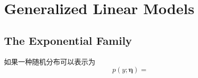 \chapter{Generalized Linear Models}
	\section{The Exponential Family}
		如果一种随机分布可以表示为
		\begin{equation}
			p(y; \bm{\eta}) = 
		\end{equation}